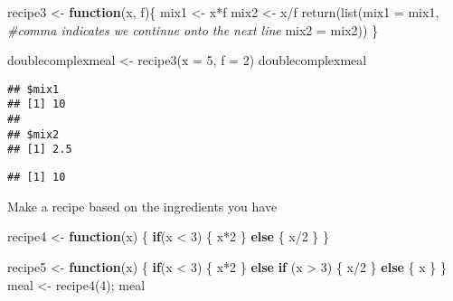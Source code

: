\documentclass[
]{article}
\newenvironment{Shaded}{\begin{snugshade}}{\end{snugshade}}
\newcommand{\AttributeTok}[1]{\textcolor[rgb]{0.77,0.63,0.00}{#1}}
\newcommand{\CommentTok}[1]{\textcolor[rgb]{0.56,0.35,0.01}{\textit{#1}}}
\newcommand{\ControlFlowTok}[1]{\textcolor[rgb]{0.13,0.29,0.53}{\textbf{#1}}}
\newcommand{\DecValTok}[1]{\textcolor[rgb]{0.00,0.00,0.81}{#1}}
\newcommand{\FunctionTok}[1]{\textcolor[rgb]{0.00,0.00,0.00}{#1}}
\newcommand{\NormalTok}[1]{#1}
\newcommand{\OtherTok}[1]{\textcolor[rgb]{0.56,0.35,0.01}{#1}}
\newcommand{\SpecialCharTok}[1]{\textcolor[rgb]{0.00,0.00,0.00}{#1}}
\begin{document}
\begin{Shaded}
\begin{Highlighting}[]
\NormalTok{recipe3 }\OtherTok{\textless{}{-}} \ControlFlowTok{function}\NormalTok{(x, f)\{}
\NormalTok{  mix1 }\OtherTok{\textless{}{-}}\NormalTok{ x}\SpecialCharTok{*}\NormalTok{f}
\NormalTok{  mix2 }\OtherTok{\textless{}{-}}\NormalTok{ x}\SpecialCharTok{/}\NormalTok{f}
  \FunctionTok{return}\NormalTok{(}\FunctionTok{list}\NormalTok{(}\AttributeTok{mix1 =}\NormalTok{ mix1, }\CommentTok{\#comma indicates we continue onto the next line}
              \AttributeTok{mix2 =}\NormalTok{ mix2))}
\NormalTok{\}}

\NormalTok{doublecomplexmeal }\OtherTok{\textless{}{-}} \FunctionTok{recipe3}\NormalTok{(}\AttributeTok{x =} \DecValTok{5}\NormalTok{, }\AttributeTok{f =} \DecValTok{2}\NormalTok{)}
\NormalTok{doublecomplexmeal}
\end{Highlighting}
\end{Shaded}

\begin{verbatim}
## $mix1
## [1] 10
## 
## $mix2
## [1] 2.5
\end{verbatim}

\begin{Shaded}
\end{Shaded}

\begin{verbatim}
## [1] 10
\end{verbatim}

Make a recipe based on the ingredients you have

\begin{Shaded}
\begin{Highlighting}[]
\NormalTok{recipe4 }\OtherTok{\textless{}{-}} \ControlFlowTok{function}\NormalTok{(x) \{}
  \ControlFlowTok{if}\NormalTok{(x }\SpecialCharTok{\textless{}} \DecValTok{3}\NormalTok{) \{}
\NormalTok{    x}\SpecialCharTok{*}\DecValTok{2}
\NormalTok{  \} }
  \ControlFlowTok{else}\NormalTok{ \{}
\NormalTok{    x}\SpecialCharTok{/}\DecValTok{2}
\NormalTok{  \}}
\NormalTok{\}}

\NormalTok{recipe5 }\OtherTok{\textless{}{-}} \ControlFlowTok{function}\NormalTok{(x) \{}
  \ControlFlowTok{if}\NormalTok{(x }\SpecialCharTok{\textless{}} \DecValTok{3}\NormalTok{) \{}
\NormalTok{    x}\SpecialCharTok{*}\DecValTok{2}
\NormalTok{  \} }
  \ControlFlowTok{else} \ControlFlowTok{if}\NormalTok{ (x }\SpecialCharTok{\textgreater{}} \DecValTok{3}\NormalTok{) \{}
\NormalTok{    x}\SpecialCharTok{/}\DecValTok{2}
\NormalTok{  \}}
  \ControlFlowTok{else}\NormalTok{ \{}
\NormalTok{    x}
\NormalTok{  \}}
\NormalTok{\}}
\NormalTok{meal }\OtherTok{\textless{}{-}} \FunctionTok{recipe4}\NormalTok{(}\DecValTok{4}\NormalTok{); meal}
\end{Highlighting}
\end{Shaded}
\end{document}
